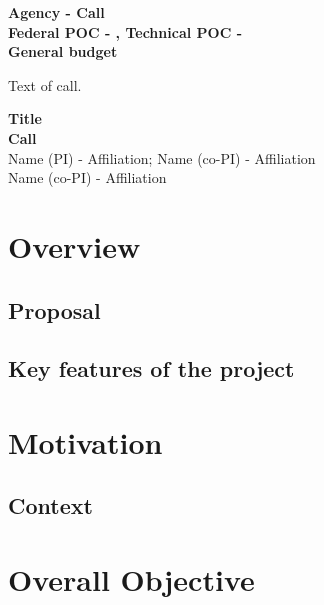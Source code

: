 \documentclass[11pt,a4paper]{article}
\begin{document}
{\centering 
    \textbf{Agency - Call \\
    Federal POC - , Technical POC - \\
    General budget\\
    }
\par
}

\noindent Text of call.

\newpage




\linenumbers %
\pagewiselinenumbers %
\modulolinenumbers[1] %


{\centering
    \textbf{Title\\
    Call\\
    }
    \vspace{0.10in}
    Name (PI) - Affiliation; Name (co-PI) - Affiliation\\
    Name (co-PI) - Affiliation
\par
}

\noindent\makebox[\linewidth]{\rule{\textwidth}{0.5pt}} %


\section*{Overview} 
\subsection*{Proposal}
\subsection*{Key features of the project}

\section*{Motivation}
\subsection*{Context}

\section*{Overall Objective}
\end{document}
